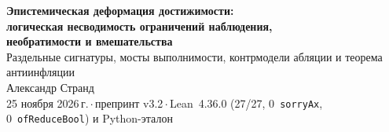 \documentclass[10pt,a4paper]{article}
\theoremstyle{cleanthm}
\theoremstyle{cleandef}
\begin{document}
\begin{center}
  {\LARGE\bfseries Эпистемическая деформация достижимости:\\[3pt]
  логическая несводимость ограничений наблюдения,\\[2pt]
  необратимости и вмешательства}\\[8pt]
  {\large\color{muted} Раздельные сигнатуры, мосты выполнимости, контрмодели абляции и теорема антиинфляции}\\[9pt]
  {\normalsize Александр Странд}\\[3pt]
  {\small\color{muted} 25 ноября 2026\,г.\,$\cdot$\,препринт v3.2\,$\cdot$\,Lean~4.36.0 (27/27, 0~\texttt{sorryAx}, 0~\texttt{ofReduceBool}) и Python-эталон}
\end{center}

\vspace{4pt}
\end{document}
